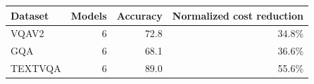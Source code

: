 \begin{tabular}{lrrr}
\toprule
Dataset & Models & Accuracy & Normalized cost reduction \\
\midrule
VQAV2 & 6 & 72.8 & 34.8\% \\
GQA & 6 & 68.1 & 36.6\% \\
TEXTVQA & 6 & 89.0 & 55.6\% \\
\bottomrule
\end{tabular}
